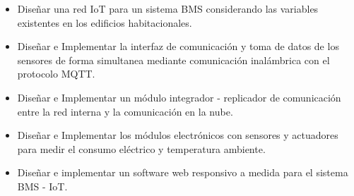 \begin{itemize}
\item Diseñar una red IoT para un sistema BMS considerando las variables existentes en los edificios habitacionales.
\item Diseñar e Implementar la interfaz de comunicación y toma de datos de los sensores de forma simultanea mediante comunicación inalámbrica con el protocolo MQTT.
\item Diseñar e Implementar un módulo integrador - replicador de comunicación entre la red interna y la comunicación en la nube.
\item Diseñar e Implementar los módulos electrónicos con sensores y actuadores para medir el consumo eléctrico y temperatura ambiente.
\item Diseñar e implementar un software web responsivo a medida para el sistema BMS - IoT.
\end{itemize}










\let\cleardoublepage\clearpage %